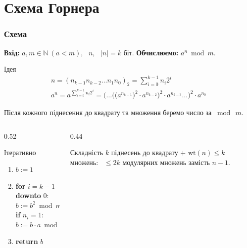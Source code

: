 \documentclass{../zkdl-presentation-template}
\begin{document}
\section{Схема Горнера}
\begin{frame}
    \frametitle{Схема}
    \small
    \textbf{Вхід:} $a,m\in\mathbb{N}\ (a<m)$, \ $n$, \ $|n|=k$ біт. \quad \textbf{Обчислюємо:} $a^{n}\bmod m$.
    \begin{block}{Ідея}
        \vspace{-4mm}
        \begin{gather*}
            n=(n_{k-1}n_{k-2}\ldots n_1n_0)_2=\textstyle\sum_{i=0}^{k-1}n_i2^{i}\\
            a^{n}=a^{\sum_{i=0}^{k-1}n_i2^{i}}=\Big(\ldots\big(\big(a^{n_{k-1}}\big)^{2}\cdot a^{n_{k-2}}\big)^{2}\cdot a^{n_{k-3}}\ldots\Big)^{2}\cdot a^{n_0}
        \end{gather*}
        \vspace{-5mm}

        {\footnotesize Після кожного піднесення до квадрату та множення беремо число за $\bmod\ m$.}
    \end{block}
    \vspace{-2mm}
    \begin{columns}[T]
        \begin{column}{0.52\textwidth}
            \begin{exampleblock}{Ітеративно}
                \begin{enumerate}
                    \item $b:=1$
                    \item \textbf{for} $i=k-1$ \textbf{downto} $0$:\\
                          \quad $b:=b^{2}\bmod m$\\
                          \quad \textbf{if} $n_i=1$: \ $b:=b\cdot a\bmod m$
                    \item \textbf{return} $b$
                \end{enumerate}
            \end{exampleblock}
        \end{column}
        \begin{column}{0.44\textwidth}
            \begin{alertblock}{Складність}
                $k$ піднесень до квадрату $+$ $\mathrm{wt}(n)\le k$ множень: \ $\le 2k$ модулярних множень замість $n-1$.
            \end{alertblock}
        \end{column}
    \end{columns}
\end{frame}
\end{document}
